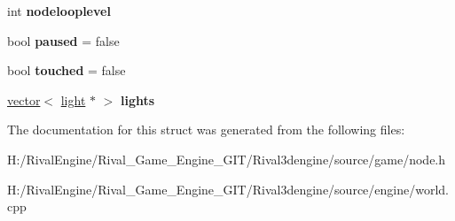 \begin{DoxyCompactItemize}
\mbox{\label{structworld_a6a8e593e475e056b408abd61e70677a5}} 
int {\bfseries nodelooplevel}
\item 
\mbox{\label{structworld_a44a87158fd4933a1ec60b5c4e3d8e213}} 
bool {\bfseries paused} = false
\item 
\mbox{\label{structworld_ad59f469693bdf72473ef48786ccbebaa}} 
bool {\bfseries touched} = false
\item 
\mbox{\label{structworld_a0224d3b53291b69cf1c97b49146a44bd}} 
\hyperlink{structvector}{vector}$<$ \hyperlink{structlight}{light} $\ast$ $>$ {\bfseries lights}
\end{DoxyCompactItemize}


The documentation for this struct was generated from the following files\+:\begin{DoxyCompactItemize}
\item 
H\+:/\+Rival\+Engine/\+Rival\+\_\+\+Game\+\_\+\+Engine\+\_\+\+G\+I\+T/\+Rival3dengine/source/game/node.\+h\item 
H\+:/\+Rival\+Engine/\+Rival\+\_\+\+Game\+\_\+\+Engine\+\_\+\+G\+I\+T/\+Rival3dengine/source/engine/world.\+cpp\end{DoxyCompactItemize}
